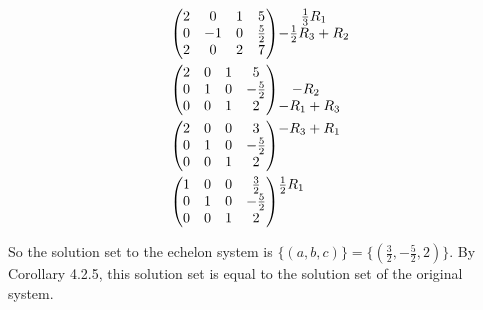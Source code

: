 \documentclass[12pt]{article}
\newenvironment{problem}[2][Problem]
{
	\begin{trivlist} 
		\item[\hskip \labelsep {\bfseries #1 #2:}]
	}
{
	\end{trivlist}
	}
\newenvironment{solution}[1][Solution]
{
	\begin{trivlist} 
		\item[\hskip \labelsep {\itshape #1:}]
	}
	{
	\end{trivlist}
}
\begin{document}
\begin{problem}{2}
\begin{solution}
\begin{align*}
%
%
%
\begin{pmatrix}2&0&1&5\\0&-1&0&\frac{5}{2}\\2&0&2&7 \end{pmatrix} 
&\begin{matrix}
\frac{1}{3}R_1 
\\
-\frac{1}{2}R_3+R_2
\\
\hphantom{1}
\end{matrix} \\
%
%
%
\begin{pmatrix}2&0&1&5\\0&1&0&-\frac{5}{2}\\0&0&1&2 \end{pmatrix} 
&\begin{matrix}
\hphantom{1}
\\
-R_2
\hphantom{1}
\\
-R_1+R_3
\end{matrix}\\
%
%
%
\begin{pmatrix}2&0&0&3\\0&1&0&-\frac{5}{2}\\0&0&1&2 \end{pmatrix} 
&\begin{matrix}
-R_3+R_1 
\hphantom{1}
\\
\hphantom{1}
\\
\hphantom{1}
\end{matrix}\\
%
%
%
\begin{pmatrix}1&0&0&\frac{3}{2}\\0&1&0&-\frac{5}{2}\\0&0&1&2 \end{pmatrix} 
&\begin{matrix}
\frac{1}{2} R_1 
\\
\hphantom{1}
\\
\hphantom{1}
\end{matrix}
\end{align*}
\end{solution}
So the solution set to the echelon system is $\{(a,b,c)\}=\{(\frac{3}{2},-\frac{5}{2},2)\}$. By Corollary 4.2.5, this solution set is equal to the solution set of the original system.
\end{problem}
\end{document}
